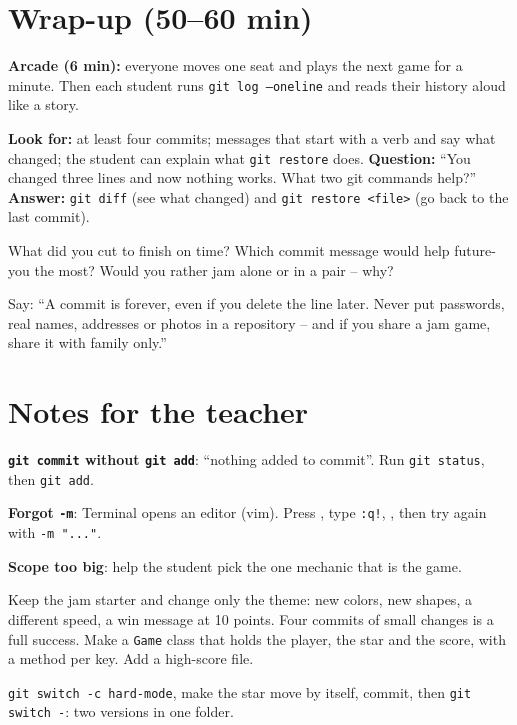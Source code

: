 \section{Wrap-up (50--60 min)}
\textbf{Arcade (6 min):} everyone moves one seat and plays the next game for a minute. Then each student runs \texttt{git log --oneline} and reads their history aloud like a story.

\begin{formativecheck}
\textbf{Look for:} at least four commits; messages that start with a verb and say what changed; the student can explain what \texttt{git restore} does.
\textbf{Question:} \enquote{You changed three lines and now nothing works. What two git commands help?}
\textbf{Answer:} \texttt{git diff} (see what changed) and \texttt{git restore <file>} (go back to the last commit).
\end{formativecheck}

\begin{reflection}
What did you cut to finish on time? Which commit message would help future-you the most? Would you rather jam alone or in a pair -- why?
\end{reflection}

\begin{safety}
Say: \enquote{A commit is forever, even if you delete the line later. Never put passwords, real names, addresses or photos in a repository -- and if you share a jam game, share it with family only.}
\end{safety}

\section{Notes for the teacher}
\begin{commonmistakes}
  \item \textbf{\texttt{git commit} without \texttt{git add}}: \enquote{nothing added to commit}. Run \texttt{git status}, then \texttt{git add}.
  \item \textbf{Forgot \texttt{-m}}: Terminal opens an editor (vim). Press , type \texttt{:q!}, , then try again with \texttt{-m "..."}.
  \item \textbf{Scope too big}: help the student pick the one mechanic that is the game.
\end{commonmistakes}

\begin{differentiation}
\supportpath Keep the jam starter and change only the theme: new colors, new shapes, a different speed, a win message at 10 points. Four commits of small changes is a full success.
\extensionpath Make a \texttt{Game} class that holds the player, the star and the score, with a method per key. Add a high-score file.
\end{differentiation}

\begin{stretchchallenge}
\texttt{git switch -c hard-mode}, make the star move by itself, commit, then \texttt{git switch -}: two versions in one folder.
\end{stretchchallenge}
